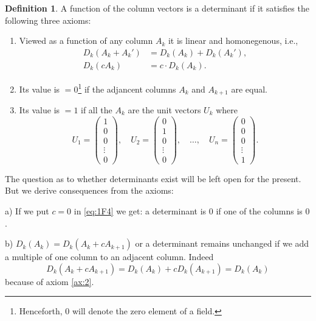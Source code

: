 \documentclass[10pt,leqno]{article}
\theoremstyle{definition}
\newtheorem*{defi*}{Definition}
\begin{document}
\begin{defi*}
A function of the column vectors is a determinant if it satisfies the following three axioms:
\begin{enumerate}
\item 
\label{ax:1}
Viewed as a function of any column $A_k$ it is linear and homonegenous, i.e.,
\begin{align}
\label{eq:1F3}
D_k(A_k + A_k') &= D_k(A_k) + D_k(A_k'),
\\
\label{eq:1F4}
D_k(c A_k) &= c \cdot D_k(A_k).
\end{align}

\item
\label{ax:2}
Its value is $=0$\footnote{Henceforth, $0$ will denote the zero element of a field.} if the adjancent columns $A_k$ and $A_{k+1}$ are equal.

\item
\label{ax:3}
Its value is $=1$ if all the $A_k$ are the unit vectors $U_k$ where
\begin{equation}
\label{eq:1F5}
U_1 = \begin{pmatrix}
1 \\
0 \\
0 \\
\vdots \\
0
\end{pmatrix},
\quad
U_2 = \begin{pmatrix}
0 \\
1 \\
0 \\
\vdots \\
0
\end{pmatrix},
\quad
\ldots, 
\quad
U_n = \begin{pmatrix}
0 \\
0 \\
0 \\
\vdots \\
1
\end{pmatrix}.
\end{equation}
\end{enumerate}
\end{defi*}


The question as to whether determinants exist will be left open for the present.
But we derive consequences from the axioms:


a) If we put $c = 0$ in \eqref{eq:1F4} we get: a determinant is $0$ if one of the columns is $0$.

b) $D_k(A_k) = D_k(A_k + c A_{k+1})$ or a determinant remains unchanged if we add a multiple of one column to an adjacent column. Indeed
\[
D_k(A_k + c A_{k+1})
= D_k(A_k) + c D_k(A_{k+1})
= D_k(A_k)
\]
because of axiom \ref{ax:2}.
\end{document}
